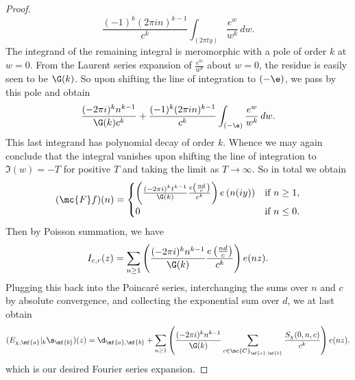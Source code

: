 \documentclass[12pt]{article}
\begin{document}
\begin{proof}
        \[
          \frac{(-1)^{k}(2\pi in)^{k-1}}{c^{k}}\int_{(2\pi ty)}\frac{e^{w}}{w^{k}}\,dw.
        \]
        The integrand of the remaining integral is meromorphic with a pole of order \(k\) at \(w = 0\). From the Laurent series expansion of \(\frac{e^{w}}{w^{k}}\) about \(w = 0\), the residue is easily seen to be \(\G(k)\). So upon shifting the line of integration to \((-\e)\), we pass by this pole and obtain
        \[
          \frac{(-2\pi i)^{k}n^{k-1}}{\G(k)c^{k}}+\frac{(-1)^{k}(2\pi in)^{k-1}}{c^{k}}\int_{(-\e)}\frac{e^{w}}{w^{k}}\,dw.
        \]
        This last integrand has polynomial decay of order \(k\). Whence we may again conclude that the integral vanishes upon shifting the line of integration to \(\Im(w) = -T\) for positive \(T\) and taking the limit as \(T \to \infty\). So in total we obtain
        \[
          (\mc{F}f)(n) = \begin{cases} \left(\frac{(-2\pi i)^{k}t^{k-1}}{\G(k)}\frac{e\left(\frac{nd}{c}\right)}{c^{k}}\right)e\left(n(iy)\right) & \text{if \(n \ge 1\)}, \\ 0 & \text{if \(n \le 0\)}. \end{cases}
        \]
        Then by Poisson summation, we have
        \[
          I_{c,r}(z) = \sum_{n \ge 1}\left(\frac{(-2\pi i)^{k}n^{k-1}}{\G(k)}\frac{e\left(\frac{nd}{c}\right)}{c^{k}}\right)e(nz).
        \]
        Plugging this back into the Poincar\'e series, interchanging the sums over \(n\) and \(c\) by absolute convergence, and collecting the exponential sum over \(d\), we at last obtain
        \[
          (E_{\chi,\mf{a}}|_{k}\s_{\mf{b}})(z) = \d_{\mf{a},\mf{b}}+\sum_{n \ge 1}\left(\frac{(-2\pi i)^{k}n^{k-1}}{\G(k)}\sum_{c \in \mc{C}_{\mf{a},\mf{b}}}\frac{S_{\chi}(0,n,c)}{c^{k}}\right)e(nz).
        \]
        which is our desired Fourier series expansion.
      \end{proof}
\end{document}
